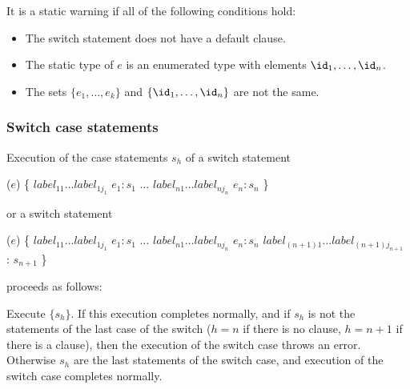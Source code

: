 \documentclass[makeidx]{article}
\begin{document}
{

\LMHash{}%
It is a static warning if all of the following conditions hold:
\begin{itemize}
\item The switch statement does not have a default clause.
\item The static type of $e$ is an enumerated type with elements $\id_1, \ldots, \id_n$.
\item The sets $\{e_1, \ldots, e_k\} $ and $\{\id_1, \ldots, \id_n\}$ are not the same.
\end{itemize}



\subsubsection{Switch case statements}

\LMHash{}%
Execution of the case statements $s_h$ of a switch statement

\begin{dartCode}
\SWITCH{} ($e$) \{
   $label_{11} \ldots label_{1j_1}$ \CASE{} $e_1: s_1$
   $\ldots$
   $label_{n1} \ldots label_{nj_n}$ \CASE{} $e_n: s_n$
\}
\end{dartCode}

or a switch statement

\begin{dartCode}
\SWITCH{} ($e$) \{
   $label_{11} \ldots label_{1j_1}$ \CASE{} $e_1: s_1$
   $\ldots$
   $label_{n1} \ldots label_{nj_n}$ \CASE{} $e_n: s_n$
   $label_{(n+1)1} \ldots label_{(n+1)j_{n+1}}$ \DEFAULT{}: $s_{n+1}$
\}
\end{dartCode}

proceeds as follows:

\LMHash{}%
Execute $\{s_h\}$.
If this execution completes normally,
and if $s_h$ is not the statements of the last case of the switch
($h = n$ if there is no \DEFAULT{} clause,
$h = n+1$ if there is a \DEFAULT{} clause),
then the execution of the switch case throws an error.
Otherwise $s_h$ are the last statements of the switch case,
and execution of the switch case completes normally.


}
\end{document}
